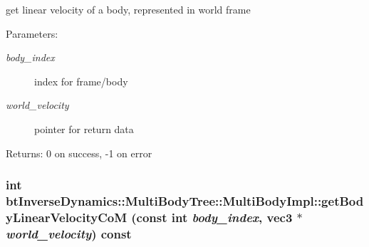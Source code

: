 get linear velocity of a body, represented in world frame \begin{Desc}
\item[Parameters:]
\begin{description}
\item[{\em body\_\-index}]index for frame/body \item[{\em world\_\-velocity}]pointer for return data \end{description}
\end{Desc}
\begin{Desc}
\item[Returns:]0 on success, -1 on error \end{Desc}
 \hypertarget{classbt_inverse_dynamics_1_1_multi_body_tree_1_1_multi_body_impl_0e79f2666001d56b28eb1df102aa970d}{
\subsubsection[getBodyLinearVelocityCoM]{\setlength{\rightskip}{0pt plus 5cm}int btInverseDynamics::MultiBodyTree::MultiBodyImpl::getBodyLinearVelocityCoM (const int {\em body\_\-index}, \/  {\bf vec3} $\ast$ {\em world\_\-velocity}) const}}
\label{classbt_inverse_dynamics_1_1_multi_body_tree_1_1_multi_body_impl_0e79f2666001d56b28eb1df102aa970d}


